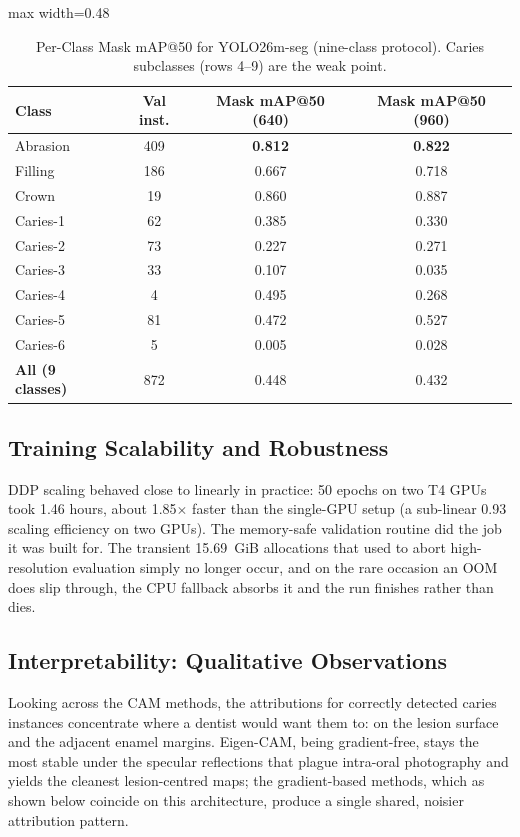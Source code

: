\documentclass[conference]{IEEEtran}
\begin{document}
\begin{table}[htbp]
\caption{Per-Class Mask mAP@50 for YOLO26m-seg (nine-class protocol). Caries subclasses (rows 4--9) are the weak point.}
\label{tab:perclass}
\centering
\begin{adjustbox}{max width=0.48\textwidth}
\begin{tabular}{lccc}
\toprule
\textbf{Class} & \textbf{Val inst.} & \textbf{Mask mAP@50 (640)} & \textbf{Mask mAP@50 (960)} \\
\midrule
Abrasion & 409 & \textbf{0.812} & \textbf{0.822} \\
Filling  & 186 & 0.667 & 0.718 \\
Crown    & 19  & 0.860 & 0.887 \\
\midrule
Caries-1 & 62 & 0.385 & 0.330 \\
Caries-2 & 73 & 0.227 & 0.271 \\
Caries-3 & 33 & 0.107 & 0.035 \\
Caries-4 & 4  & 0.495 & 0.268 \\
Caries-5 & 81 & 0.472 & 0.527 \\
Caries-6 & 5  & 0.005 & 0.028 \\
\midrule
\textbf{All (9 classes)} & 872 & 0.448 & 0.432 \\
\bottomrule
\end{tabular}
\end{adjustbox}
\end{table}

\subsection{Training Scalability and Robustness}
DDP scaling behaved close to linearly in practice: 50 epochs on two T4 GPUs took 1.46 hours, about 1.85$\times$ faster than the single-GPU setup (a sub-linear 0.93 scaling efficiency on two GPUs). The memory-safe validation routine did the job it was built for. The transient 15.69~GiB allocations that used to abort high-resolution evaluation simply no longer occur, and on the rare occasion an OOM does slip through, the CPU fallback absorbs it and the run finishes rather than dies.

\subsection{Interpretability: Qualitative Observations}
Looking across the CAM methods, the attributions for correctly detected caries instances concentrate where a dentist would want them to: on the lesion surface and the adjacent enamel margins. Eigen-CAM, being gradient-free, stays the most stable under the specular reflections that plague intra-oral photography and yields the cleanest lesion-centred maps; the gradient-based methods, which as shown below coincide on this architecture, produce a single shared, noisier attribution pattern.
\end{document}
